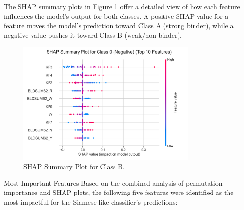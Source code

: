 \documentclass{article}
\begin{document}
The SHAP summary plots in Figure \ref{fig:shap_plots} offer a detailed view of how each feature influences the model's output for both classes. A positive SHAP value for a feature moves the model's prediction toward Class A (strong binder), while a negative value pushes it toward Class B (weak/non-binder).

\begin{figure}[h!]
\centering
\includegraphics[width=0.8\textwidth]{images/13.png}
\caption{SHAP Summary Plot for Class B.}
\label{fig:shap_plots}
\end{figure}

Most Important Features Based on the combined analysis of permutation importance and SHAP plots, the following five features were identified as the most impactful for the Siamese-like classifier's predictions:
\end{document}
